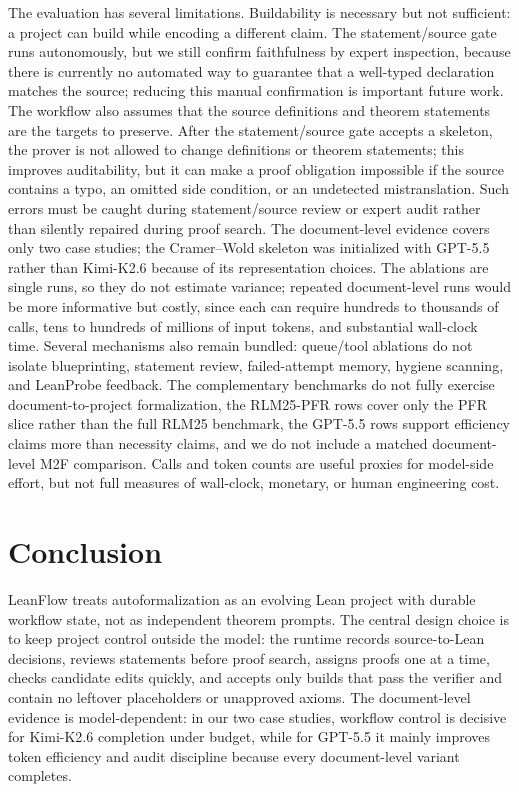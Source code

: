 \documentclass{article}
\newcommand{\method}{LeanFlow\xspace}
\newcommand{\kimi}{Kimi-K2.6\xspace}
\newcommand{\gpt}{GPT-5.5\xspace}
\newcommand{\lean}{Lean\xspace}
\begin{document}
The evaluation has several limitations.
Buildability is necessary but not sufficient: a project can build while encoding a different claim.
The statement/source gate runs autonomously, but we still confirm faithfulness by expert inspection, because there is currently no automated way to guarantee that a well-typed declaration matches the source; reducing this manual confirmation is important future work.
The workflow also assumes that the source definitions and theorem statements are the targets to preserve.
After the statement/source gate accepts a skeleton, the prover is not allowed to change definitions or theorem statements; this improves auditability, but it can make a proof obligation impossible if the source contains a typo, an omitted side condition, or an undetected mistranslation.
Such errors must be caught during statement/source review or expert audit rather than silently repaired during proof search.
The document-level evidence covers only two case studies; the Cramer--Wold skeleton was initialized with \gpt rather than \kimi because of its representation choices.
The ablations are single runs, so they do not estimate variance; repeated document-level runs would be more informative but costly, since each can require hundreds to thousands of calls, tens to hundreds of millions of input tokens, and substantial wall-clock time.
Several mechanisms also remain bundled: queue/tool ablations do not isolate blueprinting, statement review, failed-attempt memory, hygiene scanning, and LeanProbe feedback.
The complementary benchmarks do not fully exercise document-to-project formalization, the RLM25-PFR rows cover only the PFR slice rather than the full RLM25 benchmark, the \gpt rows support efficiency claims more than necessity claims, and we do not include a matched document-level M2F comparison.
Calls and token counts are useful proxies for model-side effort, but not full measures of wall-clock, monetary, or human engineering cost.


\section{Conclusion}

\method treats autoformalization as an evolving \lean project with durable workflow state, not as independent theorem prompts.
The central design choice is to keep project control outside the model: the runtime records source-to-\lean decisions, reviews statements before proof search, assigns proofs one at a time, checks candidate edits quickly, and accepts only builds that pass the verifier and contain no leftover placeholders or unapproved axioms.
The document-level evidence is model-dependent: in our two case studies, workflow control is decisive for \kimi completion under budget, while for \gpt it mainly improves token efficiency and audit discipline because every document-level variant completes.
\end{document}
